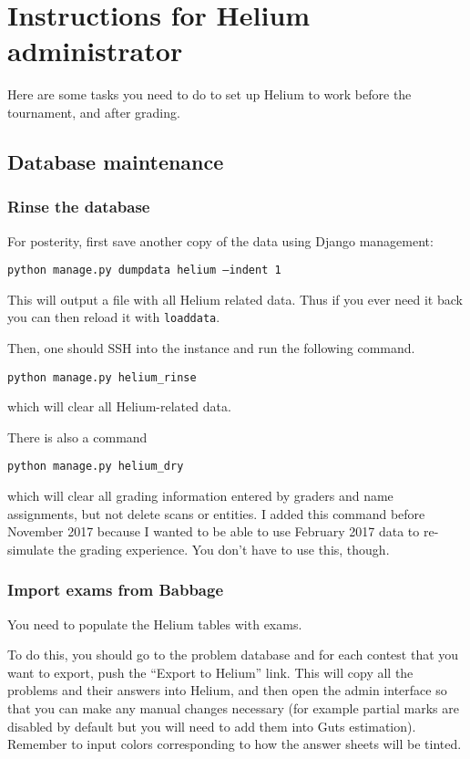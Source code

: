 \chapter{Instructions for Helium administrator}
Here are some tasks you need to do to set up Helium
to work before the tournament, and after grading.

\section{Database maintenance}
\subsection{Rinse the database}
For posterity, first save another copy of the data using Django management:
\begin{center}
	\texttt{python manage.py dumpdata helium --indent 1}
\end{center}
This will output a file with all Helium related data.
Thus if you ever need it back you can then reload it with \texttt{loaddata}.

Then, one should SSH into the instance and run the following command.
\begin{center}
	\texttt{python manage.py helium\_rinse}
\end{center}
which will clear all Helium-related data.

There is also a command
\begin{center}
	\texttt{python manage.py helium\_dry}
\end{center}
which will clear all grading information entered by graders
and name assignments, but not delete scans or entities.
I added this command before November 2017 because
I wanted to be able to use February 2017 data
to re-simulate the grading experience.
You don't have to use this, though.

\subsection{Import exams from Babbage}
You need to populate the Helium tables with exams.

To do this, you should go to the problem database and for each contest
that you want to export, push the ``Export to Helium'' link.
This will copy all the problems and their answers into Helium,
and then open the admin interface
so that you can make any manual changes necessary
(for example partial marks are disabled by default
but you will need to add them into Guts estimation).
Remember to input colors corresponding to how the answer sheets will be tinted.

